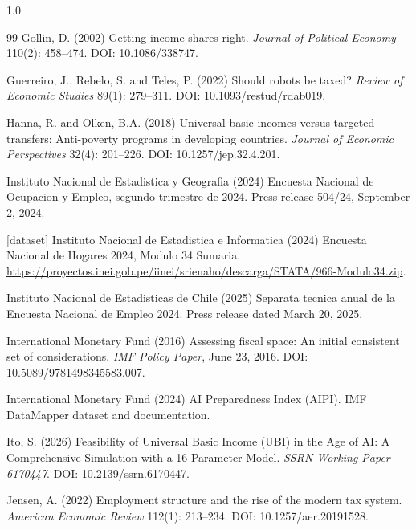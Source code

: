 \documentclass[11pt,a4paper]{article}
\begin{document}
\begin{spacing}{1.0}
\begin{thebibliography}{99}
Gollin, D. (2002)
\newblock Getting income shares right.
\newblock \emph{Journal of Political Economy} 110(2): 458--474. DOI: 10.1086/338747.

Guerreiro, J., Rebelo, S. and Teles, P. (2022)
\newblock Should robots be taxed?
\newblock \emph{Review of Economic Studies} 89(1): 279--311. DOI: 10.1093/restud/rdab019.

Hanna, R. and Olken, B.A. (2018)
\newblock Universal basic incomes versus targeted transfers: Anti-poverty programs in developing countries.
\newblock \emph{Journal of Economic Perspectives} 32(4): 201--226. DOI: 10.1257/jep.32.4.201.

Instituto Nacional de Estadistica y Geografia (2024)
\newblock Encuesta Nacional de Ocupacion y Empleo, segundo trimestre de 2024.
\newblock Press release 504/24, September 2, 2024.

[dataset] Instituto Nacional de Estadistica e Informatica (2024)
\newblock Encuesta Nacional de Hogares 2024, Modulo 34 Sumaria.
\newblock \url{https://proyectos.inei.gob.pe/iinei/srienaho/descarga/STATA/966-Modulo34.zip}.


Instituto Nacional de Estadisticas de Chile (2025)
\newblock Separata tecnica anual de la Encuesta Nacional de Empleo 2024.
\newblock Press release dated March 20, 2025.

International Monetary Fund (2016)
\newblock Assessing fiscal space: An initial consistent set of considerations.
\newblock \emph{IMF Policy Paper}, June 23, 2016. DOI: 10.5089/9781498345583.007.

International Monetary Fund (2024)
\newblock AI Preparedness Index (AIPI).
\newblock IMF DataMapper dataset and documentation.

Ito, S. (2026)
\newblock Feasibility of Universal Basic Income (UBI) in the Age of AI: A Comprehensive Simulation with a 16-Parameter Model.
\newblock \emph{SSRN Working Paper 6170447}. DOI: 10.2139/ssrn.6170447.

Jensen, A. (2022)
\newblock Employment structure and the rise of the modern tax system.
\newblock \emph{American Economic Review} 112(1): 213--234. DOI: 10.1257/aer.20191528.


\end{thebibliography}
\end{spacing}
\end{document}
